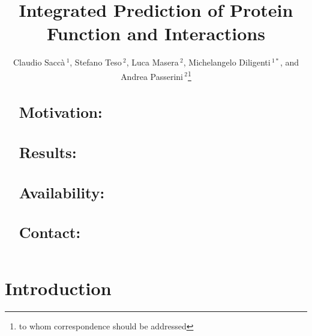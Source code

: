 \documentclass{bioinfo}
\begin{document}

\title[short Title]{Integrated Prediction of Protein Function and Interactions}
\author[Sacc\`a \textit{et~al}]{Claudio Sacc\`a\,$^{1}$, Stefano Teso\,$^{2}$, Luca Masera\,$^{2}$, Michelangelo Diligenti\,$^{1*}$, and Andrea Passerini\,$^2$\footnote{to whom correspondence should be addressed}}
\address{
    $^{1}$Dipartimento di Ingegneria dell'Informazione e Scienze Matematiche, University of Siena, Siena, Italy\\
    $^{2}$Dipartimento di Ingegneria e Scienza dell'Informazione, University of Trento, Trento, Italy
}

\maketitle



\begin{abstract}
\section{Motivation:}
\section{Results:}
\section{Availability:}
\section{Contact:}
\end{abstract}



\section{Introduction}
\end{document}
